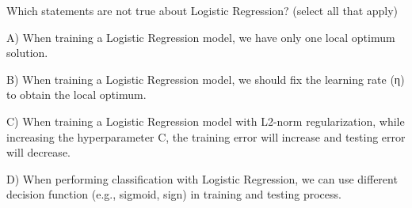 Which statements are not true about Logistic Regression? (select all that apply)


A) When training a Logistic Regression model, we have only one local optimum solution.


B) When training a Logistic Regression model, we should fix the learning rate (η) to obtain the local optimum.


C) When training a Logistic Regression model with L2-norm regularization, while increasing the hyperparameter C, the training error will increase and testing error will decrease.


D) When performing classification with Logistic Regression, we can use different decision function (e.g., sigmoid, sign) in training and testing process.
